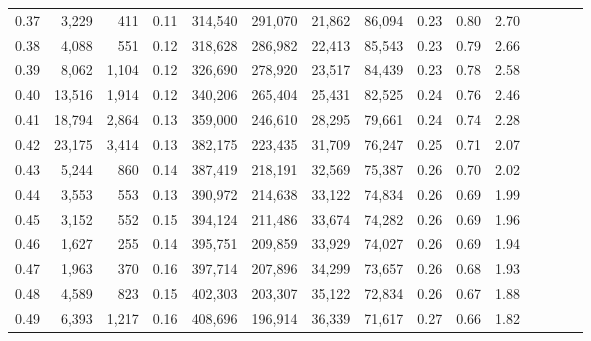 \begin{tabular}{rrrcrrrrrrrrrrr}
0.37 &   3,229 &     411 &                                       0.11 &  314,540 &  291,070 &   21,862 &   86,094 &  0.23 &  0.80 &                         2.70 \\
0.38 &   4,088 &     551 &                                       0.12 &  318,628 &  286,982 &   22,413 &   85,543 &  0.23 &  0.79 &                         2.66 \\
0.39 &   8,062 &   1,104 &                                       0.12 &  326,690 &  278,920 &   23,517 &   84,439 &  0.23 &  0.78 &                         2.58 \\
0.40 &  13,516 &   1,914 &                                       0.12 &  340,206 &  265,404 &   25,431 &   82,525 &  0.24 &  0.76 &                         2.46 \\
0.41 &  18,794 &   2,864 &                                       0.13 &  359,000 &  246,610 &   28,295 &   79,661 &  0.24 &  0.74 &                         2.28 \\
0.42 &  23,175 &   3,414 &                                       0.13 &  382,175 &  223,435 &   31,709 &   76,247 &  0.25 &  0.71 &                         2.07 \\
0.43 &   5,244 &     860 &                                       0.14 &  387,419 &  218,191 &   32,569 &   75,387 &  0.26 &  0.70 &                         2.02 \\
0.44 &   3,553 &     553 &                                       0.13 &  390,972 &  214,638 &   33,122 &   74,834 &  0.26 &  0.69 &                         1.99 \\
0.45 &   3,152 &     552 &                                       0.15 &  394,124 &  211,486 &   33,674 &   74,282 &  0.26 &  0.69 &                         1.96 \\
0.46 &   1,627 &     255 &                                       0.14 &  395,751 &  209,859 &   33,929 &   74,027 &  0.26 &  0.69 &                         1.94 \\
0.47 &   1,963 &     370 &                                       0.16 &  397,714 &  207,896 &   34,299 &   73,657 &  0.26 &  0.68 &                         1.93 \\
0.48 &   4,589 &     823 &                                       0.15 &  402,303 &  203,307 &   35,122 &   72,834 &  0.26 &  0.67 &                         1.88 \\
0.49 &   6,393 &   1,217 &                                       0.16 &  408,696 &  196,914 &   36,339 &   71,617 &  0.27 &  0.66 &                         1.82 \\

\end{tabular}
